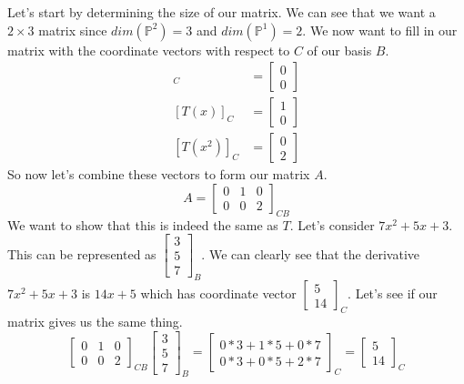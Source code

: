 \begin{example}
    Let's start by determining the size of our matrix. We can see that we want a $2\times 3$ matrix since $dim(\mathbb{P}^2)=3$ and $dim(\mathbb{P}^1)=2$. We now want to fill in our matrix with the coordinate vectors with respect to $C$ of our basis $B$.
    \begin{align*}
        [T(1)]_C&=\begin{bmatrix}
            0 \\ 0
        \end{bmatrix}\\
        [T(x)]_C&=\begin{bmatrix}
            1 \\ 0
        \end{bmatrix}\\
        [T(x^2)]_C&=\begin{bmatrix}
            0 \\ 2
        \end{bmatrix}
    \end{align*}
    So now let's combine these vectors to form our matrix $A$.
    $$A=\begin{bmatrix}
        0 & 1 & 0\\
        0 & 0 & 2
    \end{bmatrix}_{CB}$$
    We want to show that this is indeed the same as $T$. Let's consider $7x^2+5x+3$. This can be represented as $\begin{bmatrix}
        3 \\ 5 \\ 7
    \end{bmatrix}_B$. We can clearly see that the derivative $7x^2+5x+3$ is $14x+5$ which has coordinate vector $\begin{bmatrix}
        5 \\ 14
    \end{bmatrix}_C$. Let's see if our matrix gives us the same thing.
    $$\begin{bmatrix}
        0 & 1 & 0\\
        0 & 0 & 2
    \end{bmatrix}_{CB}\begin{bmatrix}
        3 \\ 5 \\ 7
    \end{bmatrix}_B=\begin{bmatrix}
        0*3+1*5+0*7\\
        0*3+0*5+2*7
    \end{bmatrix}_C=\begin{bmatrix}
        5 \\ 14
    \end{bmatrix}_C$$
\end{example}
